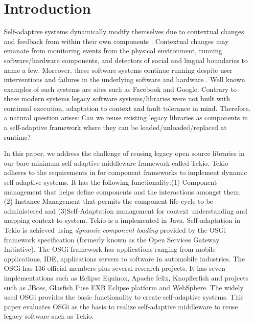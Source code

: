 \section{Introduction}
\label{sec:introduction}

Self-adaptive systems dynamically modify themselves due to contextual changes and feedback from within their own components \cite{Oreizy}. Contextual changes may emanate from monitoring events from the physical environment, running software/hardware components, and detectors of social and lingual boundaries to name a few. Moreover, these software systems continue running  despite user interventions and failures in the underlying software and hardware \cite{Brun2009}. Well known examples of such systems are sites such as Facebook and Google.  Contrary to these modern systems legacy software systems/libraries were not built with continual execution, adaptation to context and fault tolerance in mind. Therefore, a natural question arises: Can we reuse existing legacy libraries as components in a self-adaptive framework where they can be loaded/unloaded/replaced at runtime?

In this paper, we address the challenge of reusing legacy open source libraries in our bare-minimum self-adaptive middleware framework called Tekio. Tekio adheres to the requirements in  \cite{Hallsteinsen2006} for component frameworks to implement dynamic self-adaptive systems. It has the following functionality:(1) Component management that helps define components and the interactions amongst them, (2) Instance Management that permits the component life-cycle to be administered and (3)Self-Adaptation management for context understanding and mapping context to system. Tekio is a implemented in Java. Self-adaptation in Tekio is achieved using \emph{dynamic component loading}  provided by the  OSGi framework specification (formerly known as the Open Services Gateway Initiative). The OSGi framework has applications ranging from mobile applications, IDE, applications servers to software in automobile industries. The OSGi has 136 official members plus several research projects. It has seven implementations such as Eclipse Equinox, Apache felix, Knopflerfish and projects such as JBoss, Glasfish Fuse EXB Eclipse platform and WebSphere. The widely used OSGi provides the basic functionality to create self-adaptive systems. This paper evaluates OSGi as the basis to realize self-adaptive middleware to reuse legacy software such as Tekio.


